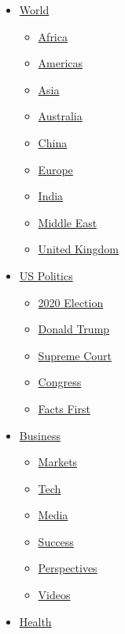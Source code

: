 \begin{itemize}
\tightlist
\item
  \href{/world}{World}

  \begin{itemize}
  \tightlist
  \item
    \href{/africa}{Africa}
  \item
    \href{/americas}{Americas}
  \item
    \href{/asia}{Asia}
  \item
    \href{/australia}{Australia}
  \item
    \href{/china}{China}
  \item
    \href{/europe}{Europe}
  \item
    \href{/india}{India}
  \item
    \href{/middle-east}{Middle East}
  \item
    \href{/uk}{United Kingdom}
  \end{itemize}
\item
  \href{/politics}{US Politics}

  \begin{itemize}
  \tightlist
  \item
    \href{/election/2020}{2020 Election}
  \item
    \href{/specials/politics/president-donald-trump-45}{Donald Trump}
  \item
    \href{/specials/politics/supreme-court-nine}{Supreme Court}
  \item
    \href{/specials/politics/congress}{Congress}
  \item
    \href{/specials/politics/fact-check-politics}{Facts First}
  \end{itemize}
\item
  \href{/business}{Business}

  \begin{itemize}
  \tightlist
  \item
    \href{https://money.cnn.com/data/markets/}{Markets}
  \item
    \href{/business/tech}{Tech}
  \item
    \href{/business/media}{Media}
  \item
    \href{/business/success}{Success}
  \item
    \href{/business/perspectives}{Perspectives}
  \item
    \href{/business/videos}{Videos}
  \end{itemize}
\item
  \href{/health}{Health}


\end{itemize}

